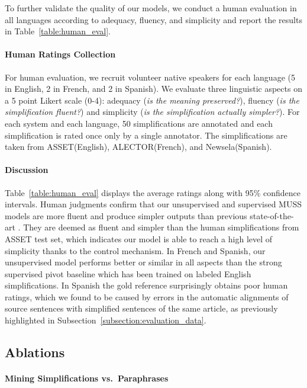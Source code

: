 \documentclass[11pt]{article}
\newcommand{\asset}{ASSET\xspace}
\newcommand{\newsela}{Newsela\xspace}
\newcommand{\alector}{ALECTOR\xspace}
\newcommand{\muss}{\textsc{MUSS}\xspace}
\begin{document}
To further validate the quality of our models, we conduct a human evaluation in all languages according to adequacy, fluency, and simplicity and report the results in Table~\ref{table:human_eval}.

\paragraph{Human Ratings Collection} For human evaluation, we recruit volunteer native speakers for each language (5 in English, 2 in French, and 2 in Spanish).
We evaluate three linguistic aspects on a 5 point Likert scale (0-4): adequacy (\emph{is the meaning preserved?}), fluency (\emph{is the simplification fluent?}) and simplicity (\emph{is the simplification actually simpler?}).
For each system and each language, 50 simplifications are annotated and each simplification is rated once only by a single annotator.
The simplifications are taken from \asset (English), \alector (French), and \newsela (Spanish).



\paragraph{Discussion}
Table~\ref{table:human_eval} displays the average ratings along with 95\% confidence intervals. Human judgments confirm that our unsupervised and supervised \muss models are more fluent and produce simpler outputs than previous state-of-the-art  \cite{martin2019camembert}. They are deemed as fluent and simpler than the human simplifications from \asset test set, which indicates our model is able to reach a high level of simplicity thanks to the control mechanism.
In French and Spanish, our unsupervised model performs better or similar in all aspects than the strong supervised pivot baseline which has been trained on labeled English simplifications.
In Spanish the gold reference surprisingly obtains poor human ratings, which we found to be caused by errors in the automatic alignments of source sentences with simplified sentences of the same article, as previously highlighted in Subsection~\ref{subsection:evaluation_data}.



\subsection{Ablations}
\label{subsection:ablations}

\paragraph{Mining Simplifications vs.~Paraphrases}
\end{document}
